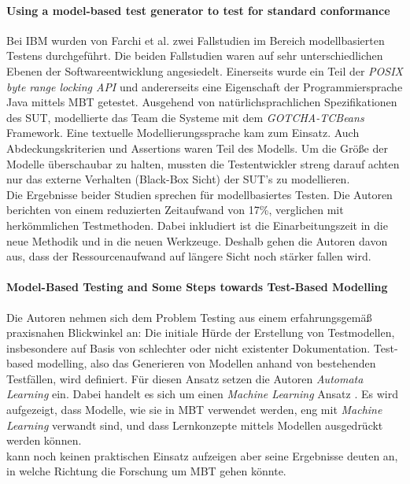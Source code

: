 \paragraph{Using a model-based test generator to test for standard conformance \cite{farchi_using_2002}}\label{sec:ibm_fallstudie}
Bei IBM wurden von Farchi et al. zwei Fallstudien im Bereich modellbasierten Testens durchgeführt. Die beiden Fallstudien waren auf sehr unterschiedlichen Ebenen der Softwareentwicklung angesiedelt. Einerseits wurde ein Teil der \textit{POSIX byte range locking API} \cite{posix_2008} und andererseits eine Eigenschaft der Programmiersprache Java mittels \Gls{MBT} getestet. Ausgehend von natürlichsprachlichen Spezifikationen des \Gls{SUT}, modellierte das Team die Systeme mit dem \textit{GOTCHA-TCBeans} Framework. Eine textuelle Modellierungssprache kam zum Einsatz. Auch Abdeckungskriterien und Assertions waren Teil des Modells. Um die Größe der Modelle überschaubar zu halten, mussten die Testentwickler streng darauf achten nur das externe Verhalten (Black-Box Sicht) der SUT's zu modellieren.\\
Die Ergebnisse beider Studien sprechen für modellbasiertes Testen. Die Autoren berichten von einem reduzierten Zeitaufwand von 17\%, verglichen mit herkömmlichen Testmethoden. Dabei inkludiert ist die Einarbeitungszeit in die neue Methodik und in die neuen Werkzeuge. Deshalb gehen die Autoren davon aus, dass der Ressourcenaufwand auf längere Sicht noch stärker fallen wird.

\paragraph{Model-Based Testing and Some Steps towards Test-Based Modelling \cite{tretmans_model-based_2011}} \label{sec:test_based_modelling} Die Autoren nehmen sich dem Problem Testing aus einem erfahrungsgemäß praxisnahen Blickwinkel an: Die initiale Hürde der Erstellung von Testmodellen, insbesondere auf Basis von schlechter oder nicht existenter Dokumentation. Test-based modelling, also das Generieren von Modellen anhand von bestehenden Testfällen, wird definiert. Für diesen Ansatz setzen die Autoren \textit{Automata Learning} ein. Dabei handelt es sich um einen \textit{Machine Learning} Ansatz \cite{narendra_learning_1974}. Es wird aufgezeigt, dass Modelle, wie sie in \Gls{MBT} verwendet werden, eng mit \textit{Machine Learning} verwandt sind, und dass Lernkonzepte mittels Modellen ausgedrückt werden können.\\
\citeauthor{tretmans_model-based_2011} kann noch keinen praktischen Einsatz aufzeigen aber seine Ergebnisse deuten an, in welche Richtung die Forschung um \Gls{MBT} gehen könnte.

